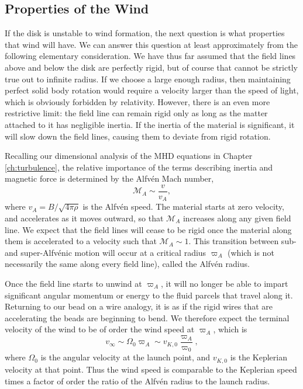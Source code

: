 \subsection{Properties of the Wind}

If the disk is unstable to wind formation, the next question is what properties that wind will have. We can answer this question at least approximately from the following elementary consideration. We have thus far assumed that the field lines above and below the disk are perfectly rigid, but of course that cannot be strictly true out to infinite radius. If we choose a large enough radius, then maintaining perfect solid body rotation would require a velocity larger than the speed of light, which is obviously forbidden by relativity. However, there is an even more restrictive limit: the field line can remain rigid only as long as the matter attached to it has negligible inertia. If the inertia of the material is significant, it will slow down the field lines, causing them to deviate from rigid rotation.

Recalling our dimensional analysis of the MHD equations in Chapter \ref{ch:turbulence}, the relative importance of the terms describing inertia and magnetic force is determined by the Alfv\'en Mach number,
\begin{equation}
\mathcal{M}_A \sim \frac{v}{v_A},
\end{equation}
where $v_A = B/\sqrt{4\pi \rho}$ is the Alfv\'{e}n speed. The material starts at zero velocity, and accelerates as it moves outward, so that $\mathcal{M}_A$ increases along any given field line. We expect that the field lines will cease to be rigid once the material along them is accelerated to a velocity such that $\mathcal{M}_A \sim 1$. This transition between sub- and super-Alfv\'{e}nic motion will occur at a critical radius $\varpi_A$ (which is not necessarily the same along every field line), called the Alfv\'{e}n radius.

Once the field line starts to unwind at $\varpi_A$, it will no longer be able to impart significant angular momentum or energy to the fluid parcels that travel along it. Returning to our bead on a wire analogy, it is as if the rigid wires that are accelerating the beads are beginning to bend. We therefore expect the terminal velocity of the wind to be of order the wind speed at $\varpi_A$, which is
\begin{equation}
v_\infty \sim \Omega_0 \varpi_A \sim v_{K,0} \frac{\varpi_A}{\varpi_0},
\end{equation}
where $\Omega_0$ is the angular velocity at the launch point, and $v_{K,0}$ is the Keplerian velocity at that point. Thus the wind speed is comparable to the Keplerian speed times a factor of order the ratio of the Alfv\'{e}n radius to the launch radius.

